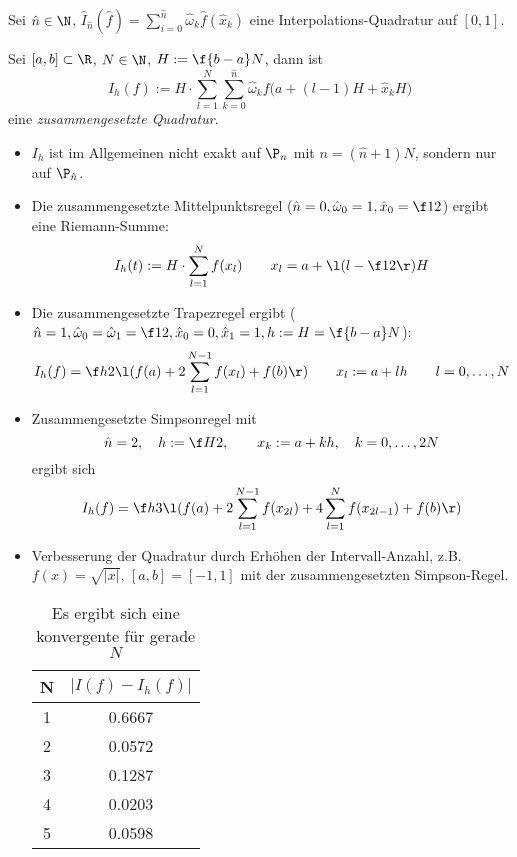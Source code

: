 \documentclass[11pt]{scrbook}
\begin{document}
\begin{df}
	\label{2.13}
	Sei $\hat n \in \N$, $\hat I_{\hat n}(\hat f) = \sum_{i=0}^{\hat n}\hat \omega_k \hat f(\hat x_k)$ eine Interpolations-Quadratur auf $[0,1]$.

	Sei $[a,b]\subset \R$, $N\in \N$, $H:= \f {b-a}N$, dann ist
	\[
		I_h (f) := H \cdot \sum_{l=1}^N \sum_{k=0}^{\hat n}\hat \omega_k f\Big(a+(l-1)H + \hat x_k H\Big)
	\]
	eine \emph{zusammengesetzte Quadratur}.
\end{df}

\begin{nt*}
	\begin{itemize}
		\item
			$I_h$ ist im Allgemeinen nicht exakt auf $\P_n$ mit $n=(\hat n + 1) N$, sondern nur auf $\P_{\hat n}$.
		\item
			Die zusammengesetzte Mittelpunktsregel ($\hat n = 0, \hat \omega_0 = 1, \hat x_0 = \f 12$) ergibt eine Riemann-Summe:
			\[
				I_h(t) := H \cdot \sum_{l=1}^N f (x_l) \qquad x_l = a + \l(l- \f 12\r) H
			\]
		\item
			Die zusammengesetzte Trapezregel ergibt ($\hat n = 1, \hat \omega_0 = \hat \omega_1 = \f 12, \hat x_0 = 0, \hat x_1 = 1, h := H = \f {b-a}N$):
			\[
				I_h(f) = \f h2 \l(f(a) + 2 \sum_{l=1}^{N-1}f(x_l) + f(b)\r) \qquad x_l := a+ lh \qquad l=0,\dotsc,N
			\]
		\item
			Zusammengesetzte Simpsonregel mit
			\[
				\hat n = 2, \quad h := \f H2, \qquad x_k := a+kh, \quad k=0,\dotsc, 2N
			\]
			ergibt sich
			\[
				I_h(f) = \f h3 \l( f(a) + 2 \sum_{l=1}^{N-1}f(x_{2l}) + 4 \sum_{l=1}^{N}f(x_{2l-1}) + f(b)\r)
			\]
		\item
			Verbesserung der Quadratur durch Erhöhen der Intervall-Anzahl, z.B. $f(x)= \sqrt{|x|}$, $[a,b]=[-1,1]$ mit der zusammengesetzten Simpson-Regel.
			\begin{table}[!ht]
				\centering
				\caption{Es ergibt sich eine konvergente für gerade $N$}
				\begin{tabular}{c|c}
					N & $|I(f)-I_h(f)|$ \\ \hline
					1 & 0.6667 \\
					2 & 0.0572 \\
					3 & 0.1287 \\
					4 & 0.0203 \\
					5 & 0.0598
				\end{tabular}
			\end{table}
	\end{itemize}
\end{nt*}
\end{document}
